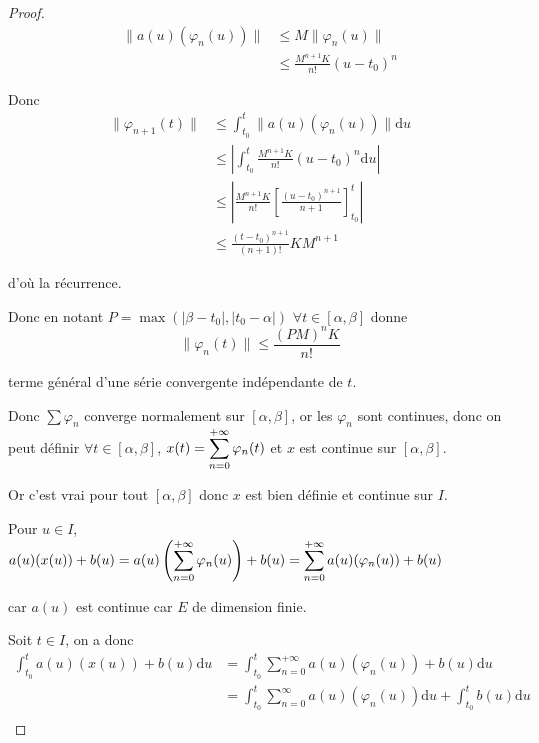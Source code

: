 \begin{proof}
    \begin{align}
        \| a(u)(\varphi_n(u)) \| & \leqslant M \| \varphi_n(u) \| \\
        & \leqslant \frac{M^{n + 1} K}{n!}(u - t_0)^n
    \end{align}

    Donc 
    \begin{align}
        \| \varphi_{n + 1}(t) \| & \leqslant \int_{t_0}^{t} \| a(u)(\varphi_n(u)) \| \mathrm d u \\
        & \leqslant \left| \int_{t_0}^{t} \frac{M^{n + 1}K}{n!} (u - t_0)^n \mathrm d u \right| \\
        & \leqslant \left| \frac{M^{n + 1} K }{n!} \left[ \frac{(u - t_0)^{n + 1}}{n + 1} \right]_{t_0}^{t} \right| \\
        & \leqslant \frac{(t - t_0)^{n + 1}}{(n + 1)!} K M^{n + 1}
    \end{align}

    d'où la récurrence. 

    Donc en notant $P = \max (|\beta - t_0|, |t_0 - \alpha|)$ 
    $\forall t \in [\alpha, \beta]$ donne 
    $$\| \varphi_n(t) \| \leqslant \frac{(PM)^n K }{n!}$$

    terme général d'une série convergente indépendante de $t$. 

    Donc $\sum \varphi_n$ converge normalement sur $[\alpha, \beta]$, or 
    les $\varphi_n$ sont continues, donc on peut définir 
    $\forall t \in [\alpha, \beta]$, $\displaystyle x(t) = \sum_{n = 0}^{+ \infty} \varphi_n(t)$ et 
    $x$ est continue sur $[\alpha, \beta]$.

    Or c'est vrai pour tout $[\alpha, \beta]$ donc $x$ est bien définie et continue sur $I$. 

    Pour $u \in I$, $a(u)(x(u)) + b(u) = \displaystyle a(u) \left( \sum_{n = 0}^{+ \infty} \varphi_n(u) \right) + b(u) = \sum_{n = 0}^{+ \infty} a(u)(\varphi_n(u)) + b(u)$

    car $a(u)$ est continue car $E$ de dimension finie. 

    Soit $t \in I$, on a donc 
    \begin{align}
        \int_{t_0}^{t} a(u)(x(u)) + b(u) \mathrm d u & = \int_{t_0}^{t} \sum_{n = 0}^{+ \infty} a(u)(\varphi_n(u)) + b(u) \mathrm d u \\
        & = \int_{t_0}^{t} \sum_{n = 0}^{\infty} a(u)(\varphi_n(u)) \mathrm d u + \int_{t_0}^{t} b(u) \mathrm d u \\
    \end{align}


\end{proof}
